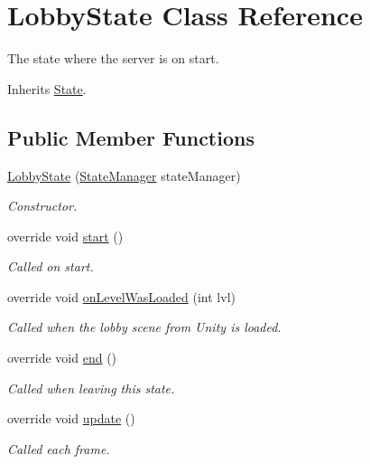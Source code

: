 \hypertarget{class_lobby_state}{\section{Lobby\-State Class Reference}
\label{class_lobby_state}
}


The state where the server is on start. 




Inherits \hyperlink{class_state}{State}.

\subsection*{Public Member Functions}
\begin{DoxyCompactItemize}
\item 
\hyperlink{class_lobby_state_a321f340f4a53959ad3516a5e28a38e4f}{Lobby\-State} (\hyperlink{class_state_manager}{State\-Manager} state\-Manager)
\begin{DoxyCompactList}\small\item\em Constructor.\end{DoxyCompactList}\item 
override void \hyperlink{class_lobby_state_a85edd8fa8fa077fac18b47a6cff2c4b6}{start} ()
\begin{DoxyCompactList}\small\item\em Called on start.\end{DoxyCompactList}\item 
override void \hyperlink{class_lobby_state_abc60bf813e23a727a151aecf58be3b41}{on\-Level\-Was\-Loaded} (int lvl)
\begin{DoxyCompactList}\small\item\em Called when the lobby scene from Unity is loaded.\end{DoxyCompactList}\item 
override void \hyperlink{class_lobby_state_ab73776a43f5851a75019c6b845856e6e}{end} ()
\begin{DoxyCompactList}\small\item\em Called when leaving this state.\end{DoxyCompactList}\item 
override void \hyperlink{class_lobby_state_a9d397dd0ec4eb121101208d67e1bd55a}{update} ()
\begin{DoxyCompactList}\small\item\em Called each frame.\end{DoxyCompactList}\item 

\end{DoxyCompactItemize}
